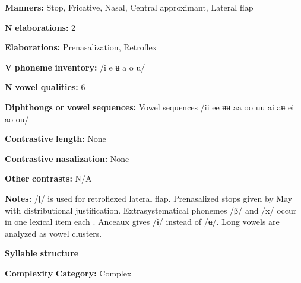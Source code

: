 \begin{styleBody}
\textbf{Manners:} Stop, Fricative, Nasal, Central approximant, Lateral flap
\end{styleBody}

\begin{styleBody}
\textbf{N} \textbf{elaborations:} 2
\end{styleBody}

\begin{styleBody}
\textbf{Elaborations:} Prenasalization, Retroflex
\end{styleBody}

\begin{styleBody}
\textbf{V} \textbf{phoneme} \textbf{inventory:} /i e ʉ a o u/
\end{styleBody}

\begin{styleBody}
\textbf{N} \textbf{vowel} \textbf{qualities:} 6
\end{styleBody}

\begin{styleBody}
\textbf{Diphthongs} \textbf{or} \textbf{vowel} \textbf{sequences:} Vowel sequences /ii ee ʉʉ aa oo uu ai aʉ ei ao ou/
\end{styleBody}

\begin{styleBody}
\textbf{Contrastive} \textbf{length:} None
\end{styleBody}

\begin{styleBody}
\textbf{Contrastive} \textbf{nasalization:} None
\end{styleBody}

\begin{styleBody}
\textbf{Other} \textbf{contrasts:} N/A
\end{styleBody}

\begin{styleBody}
\textbf{Notes:} /ɭ/ is used for retroflexed lateral flap. Prenasalized stops given by May with distributional justification. Extrasystematical phonemes /β/ and /x/ occur in one lexical item each \citep[9]{Anceaux1965}. Anceaux gives /ɨ/ instead of /ʉ/. Long vowels are analyzed as vowel clusters.
\end{styleBody}

\begin{styleBody}
\textbf{Syllable} \textbf{structure}
\end{styleBody}

\begin{styleBody}
\textbf{Complexity} \textbf{Category:} Complex
\end{styleBody}

